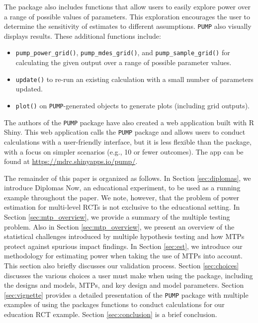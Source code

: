\documentclass[
]{jss}
\providecommand{\tightlist}{%
  \setlength{\itemsep}{0pt}\setlength{\parskip}{0pt}}
\begin{document}
The package also includes functions that allow users to easily explore
power over a range of possible values of parameters. This exploration
encourages the user to determine the sensitivity of estimates to
different assumptions. \texttt{PUMP} also visually displays results.
These additional functions include:

\begin{itemize}
\tightlist
\item
  \texttt{pump\_power\_grid()}, \texttt{pump\_mdes\_grid()}, and
  \texttt{pump\_sample\_grid()} for calculating the given output over a
  range of possible parameter values.
\item
  \texttt{update()} to re-run an existing calculation with a small
  number of parameters updated.
\item
  \texttt{plot()} on \texttt{PUMP}-generated objects to generate plots
  (including grid outputs).
\end{itemize}

The authors of the \texttt{PUMP} package have also created a web
application built with R Shiny. This web application calls the
\texttt{PUMP} package and allows users to conduct calculations with a
user-friendly interface, but it is less flexible than the package, with
a focus on simpler scenarios (e.g., 10 or fewer outcomes). The app can
be found at \url{https://mdrc.shinyapps.io/pump/}.

The remainder of this paper is organized as follows. In Section
\ref{sec:diplomas}, we introduce Diplomas Now, an educational
experiment, to be used as a running example throughout the paper. We
note, however, that the problem of power estimation for multi-level RCTs
is not exclusive to the educational setting. In Section
\ref{sec:mtp_overview}, we provide a summary of the multiple testing
problem. Also in Section \ref{sec:mtp_overview}, we present an overview
of the statistical challenges introduced by multiple hypothesis testing
and how MTPs protect against spurious impact findings. In Section
\ref{sec:est}, we introduce our methodology for estimating power when
taking the use of MTPs into account. This section also briefly discusses
our validation process. Section \ref{sec:choices} discusses the various
choices a user must make when using the package, including the designs
and models, MTPs, and key design and model parameters. Section
\ref{sec:vignette} provides a detailed presentation of the \texttt{PUMP}
package with multiple examples of using the packages functions to
conduct calculations for our education RCT example. Section
\ref{sec:conclusion} is a brief conclusion.
\end{document}
